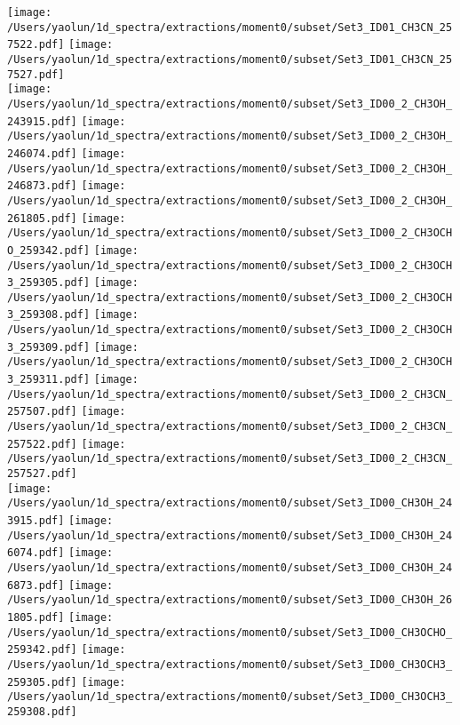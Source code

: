 \begin{figure*}[htbp!]
  \texttt{[image: /Users/yaolun/1d\_spectra/extractions/moment0/subset/Set3\_ID01\_CH3CN\_257522.pdf]}
  \texttt{[image: /Users/yaolun/1d\_spectra/extractions/moment0/subset/Set3\_ID01\_CH3CN\_257527.pdf]}
  \\
  \texttt{[image: /Users/yaolun/1d\_spectra/extractions/moment0/subset/Set3\_ID00\_2\_CH3OH\_243915.pdf]}
  \texttt{[image: /Users/yaolun/1d\_spectra/extractions/moment0/subset/Set3\_ID00\_2\_CH3OH\_246074.pdf]}
  \texttt{[image: /Users/yaolun/1d\_spectra/extractions/moment0/subset/Set3\_ID00\_2\_CH3OH\_246873.pdf]}
  \texttt{[image: /Users/yaolun/1d\_spectra/extractions/moment0/subset/Set3\_ID00\_2\_CH3OH\_261805.pdf]}
  \texttt{[image: /Users/yaolun/1d\_spectra/extractions/moment0/subset/Set3\_ID00\_2\_CH3OCHO\_259342.pdf]}
  \texttt{[image: /Users/yaolun/1d\_spectra/extractions/moment0/subset/Set3\_ID00\_2\_CH3OCH3\_259305.pdf]}
  \texttt{[image: /Users/yaolun/1d\_spectra/extractions/moment0/subset/Set3\_ID00\_2\_CH3OCH3\_259308.pdf]}
  \texttt{[image: /Users/yaolun/1d\_spectra/extractions/moment0/subset/Set3\_ID00\_2\_CH3OCH3\_259309.pdf]}
  \texttt{[image: /Users/yaolun/1d\_spectra/extractions/moment0/subset/Set3\_ID00\_2\_CH3OCH3\_259311.pdf]}
  \texttt{[image: /Users/yaolun/1d\_spectra/extractions/moment0/subset/Set3\_ID00\_2\_CH3CN\_257507.pdf]}
  \texttt{[image: /Users/yaolun/1d\_spectra/extractions/moment0/subset/Set3\_ID00\_2\_CH3CN\_257522.pdf]}
  \texttt{[image: /Users/yaolun/1d\_spectra/extractions/moment0/subset/Set3\_ID00\_2\_CH3CN\_257527.pdf]}
  \\
  \texttt{[image: /Users/yaolun/1d\_spectra/extractions/moment0/subset/Set3\_ID00\_CH3OH\_243915.pdf]}
  \texttt{[image: /Users/yaolun/1d\_spectra/extractions/moment0/subset/Set3\_ID00\_CH3OH\_246074.pdf]}
  \texttt{[image: /Users/yaolun/1d\_spectra/extractions/moment0/subset/Set3\_ID00\_CH3OH\_246873.pdf]}
  \texttt{[image: /Users/yaolun/1d\_spectra/extractions/moment0/subset/Set3\_ID00\_CH3OH\_261805.pdf]}
  \texttt{[image: /Users/yaolun/1d\_spectra/extractions/moment0/subset/Set3\_ID00\_CH3OCHO\_259342.pdf]}
  \texttt{[image: /Users/yaolun/1d\_spectra/extractions/moment0/subset/Set3\_ID00\_CH3OCH3\_259305.pdf]}
  \texttt{[image: /Users/yaolun/1d\_spectra/extractions/moment0/subset/Set3\_ID00\_CH3OCH3\_259308.pdf]}

\end{figure*}
